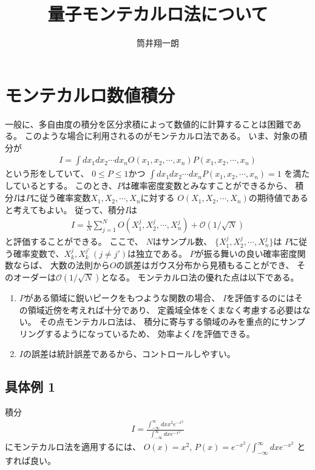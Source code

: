 \documentclass[]{ltjsarticle}
\newcommand{\calO}{\mathcal{O}}
\begin{document}
\title{量子モンテカルロ法について}


\author{筒井翔一朗}


\maketitle
\tableofcontents


\section{モンテカルロ数値積分}
一般に、多自由度の積分を区分求積によって数値的に計算することは困難である。
このような場合に利用されるのがモンテカルロ法である。
いま、対象の積分が
\begin{align}
    I 
    = 
    \int dx_1 dx_2 \cdots dx_n 
    O(x_1,x_2,\cdots,x_n) P(x_1,x_2,\cdots,x_n)
\end{align}
という形をしていて、
$0 \leq P \leq 1$かつ
$\int dx_1 dx_2 \cdots dx_n P(x_1,x_2,\cdots,x_n) = 1$
を満たしているとする。
このとき、$P$は確率密度変数とみなすことができるから、
積分$I$は$P$に従う確率変数$X_1,X_2,\cdots,X_n$に対する
$O(X_1,X_2,\cdots,X_n)$の期待値であると考えてもよい。
従って、積分$I$は
\begin{align}
    I 
    = 
    \frac{1}{N}\sum_{j=1}^N O(X_1^j,X_2^j,\cdots,X_n^j)
    +
    \calO(1/\sqrt{N})
\end{align}
と評価することができる。
ここで、
$N$はサンプル数、
$\{X_1^j,X_2^j,\cdots,X_n^j\}$は
$P$に従う確率変数で、$X_k^j, X_k^{j'} \, (j \neq j')$は独立である。
$P$が振る舞いの良い確率密度関数ならば、
大数の法則から$O$の誤差はガウス分布から見積もることができ、
そのオーダーは$\calO(1/\sqrt{N})$となる。
モンテカルロ法の優れた点は以下である。
\begin{enumerate}
    \item $P$がある領域に鋭いピークをもつような関数の場合、
    $I$を評価するのにはその領域近傍を考えれば十分であり、
    定義域全体をくまなく考慮する必要はない。
    その点モンテカルロ法は、
    積分に寄与する領域のみを重点的にサンプリングするようになっているため、
    効率よく$I$を評価できる。
    \item $I$の誤差は統計誤差であるから、コントロールしやすい。
\end{enumerate}


\subsection{具体例 1}
積分
\begin{align}
    I 
    =
    \frac{
        \int_{-\infty}^\infty dx x^2 e^{-x^2}
        }{
        \int_{-\infty}^\infty dx e^{-x^2}
    } 
\end{align}
にモンテカルロ法を適用するには、
$O(x) = x^2$, $P(x) = e^{-x^2}/\int_{-\infty}^\infty dx e^{-x^2}$
とすれば良い。
\end{document}
